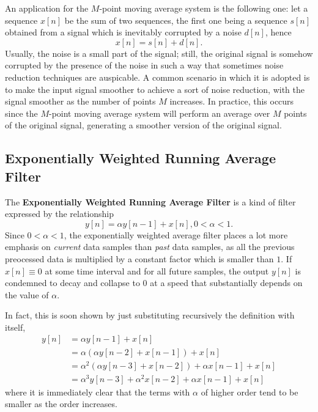 \documentclass[\documentfontsize, twocolumn]{\classname}
\begin{document}
An application for the $M$-point moving average system is the following one: let a sequence $x[n]$ be the sum of two sequences, the first one being a sequence $s[n]$ obtained from a signal which is inevitably corrupted by a noise $d[n]$, hence \[x[n] = s[n] + d[n].\] Usually, the noise is a small part of the signal; still, the original signal is somehow corrupted by the presence of the noise in such a way that sometimes noise reduction techniques are auspicable. A common scenario in which it is adopted is to make the input signal smoother to achieve a sort of noise reduction, with the signal smoother as the number of points $M$ increases. In practice, this occurs since the $M$-point moving average system will perform an average over $M$ points of the original signal, generating a smoother version of the original signal.

\subsection{Exponentially Weighted Running Average Filter}

The \textbf{Exponentially Weighted Running Average Filter} is a kind of filter expressed by the relationship
\begin{equation}\label{eqn:exponentiallyWeightedRunningAverageFilterEquation}
    y[n] = \alpha y[n-1] + x[n], 0 < \alpha < 1.
\end{equation}
Since $0 < \alpha < 1$, the exponentially weighted average filter places a lot more emphasis on \emph{current} data samples than \emph{past} data samples, as all the previous preocessed data is multiplied by a constant factor which is smaller than $1$. If $x[n]\equiv 0$ at some time interval and for all future samples, the output $y[n]$ is condemned to decay and collapse to $0$ at a speed that substantially depends on the value of $\alpha$.

In fact, this is soon shown by just substituting recursively the definition with itself,
\begin{align*}
    y[n] &= \alpha y[n-1] + x[n]\\
         &= \alpha(\alpha y[n-2] + x[n-1]) + x[n]\\
         &= \alpha^2(\alpha y[n-3] + x[n-2]) + \alpha x[n-1] + x[n]\\
         &= \alpha^3y[n-3] + \alpha^2 x[n-2] + \alpha x[n-1] + x[n]
\end{align*}
where it is immediately clear that the terms with $\alpha$ of higher order tend to be smaller as the order increases.
\end{document}

